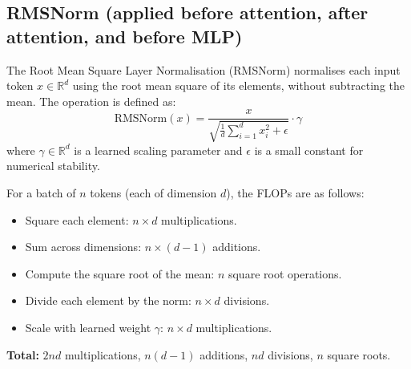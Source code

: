 \documentclass[a4paper,12pt]{article}
\begin{document}
\subsection*{RMSNorm (applied before attention, after attention, and before MLP)}

The Root Mean Square Layer Normalisation (RMSNorm) \citep{zhang2019root} normalises each input token $x \in \mathbb{R}^d$ using the root mean square of its elements, without subtracting the mean. The operation is defined as:
\begin{equation}
\text{RMSNorm}(x) = \frac{x}{\sqrt{\frac{1}{d} \sum_{i=1}^{d} x_i^2 + \epsilon}} \cdot \gamma
\end{equation}
where $\gamma \in \mathbb{R}^d$ is a learned scaling parameter and $\epsilon$ is a small constant for numerical stability.

For a batch of $n$ tokens (each of dimension $d$), the FLOPs are as follows:
\begin{itemize}
  \item Square each element: $n \times d$ multiplications.
  \item Sum across dimensions: $n \times (d - 1)$ additions.
  \item Compute the square root of the mean: $n$ square root operations.
  \item Divide each element by the norm: $n \times d$ divisions.
  \item Scale with learned weight $\gamma$: $n \times d$ multiplications.
\end{itemize}

\textbf{Total:} $2nd$ multiplications, $n(d - 1)$ additions, $nd$ divisions, $n$ square roots.
\end{document}
